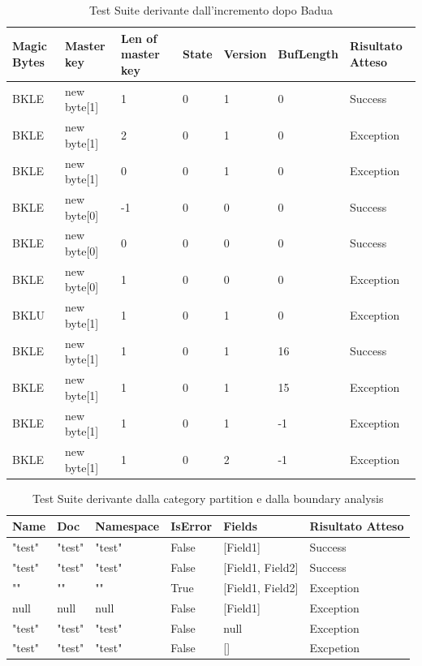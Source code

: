 \documentclass[12pt, a4paper]{article}
\begin{document}
\begin{table}[ht]
  \centering
  \caption[FileInfo: Test Suite - Adequacy Data Flow]{Test Suite derivante dall'incremento dopo Badua}
  \begin{tabular}{|l|l|l|l|l|l|l|}
    \hline
    \textbf{Magic Bytes} & \textbf{Master key} & \textbf{Len of master key}  & \textbf{State} & \textbf{Version} & \textbf{BufLength} & \textbf{Risultato Atteso} \\
    \hline
    BKLE & new byte[1] & 1 & 0 & 1 & 0 & Success \\
    BKLE & new byte[1] & 2 & 0 & 1 & 0 & Exception \\
    BKLE & new byte[1] & 0 & 0 & 1 & 0 & Exception \\
    BKLE & new byte[0] & -1 & 0 & 0 & 0 & Success \\
    BKLE & new byte[0] & 0 & 0 & 0 & 0 & Success \\
    BKLE & new byte[0] & 1 & 0 & 0 & 0 & Exception \\
    BKLU & new byte[1] & 1 & 0 & 1 & 0 & Exception \\
    BKLE & new byte[1] & 1 & 0 & 1 & 16 & Success \\
    BKLE & new byte[1] & 1 & 0 & 1 & 15 & Exception \\
    BKLE & new byte[1] & 1 & 0 & 1 & -1 & Exception \\
    BKLE & new byte[1] & 1 & 0 & 2 & -1 & Exception \\
    \hline
  \end{tabular}
  \label{tab:ADF1ReadHeader}
\end{table}


\begin{table}[ht]
  \centering
  \caption[CreateRecord: Test Suite - Category partition]{Test Suite derivante dalla category partition e dalla boundary analysis}
  \begin{tabular}{|l|l|l|l|l|l|}
    \hline
    \textbf{Name} & \textbf{Doc} & \textbf{Namespace}  & \textbf{IsError} & \textbf{Fields} & \textbf{Risultato Atteso} \\
    \hline
    "test" & "test" & "test" & False & [Field1] & Success \\
    "test" & "test" & "test" & False & [Field1, Field2] & Success \\
    "" & "" & "" & True & [Field1, Field2] & Exception \\
    null & null & null & False & [Field1] & Exception \\
    "test" & "test" & "test" & False & null & Exception \\
    "test" & "test" & "test" & False & [] & Excpetion \\

    \hline
  \end{tabular}
  \label{tab:categoryPartition1CreateRecord}
\end{table}
\end{document}

